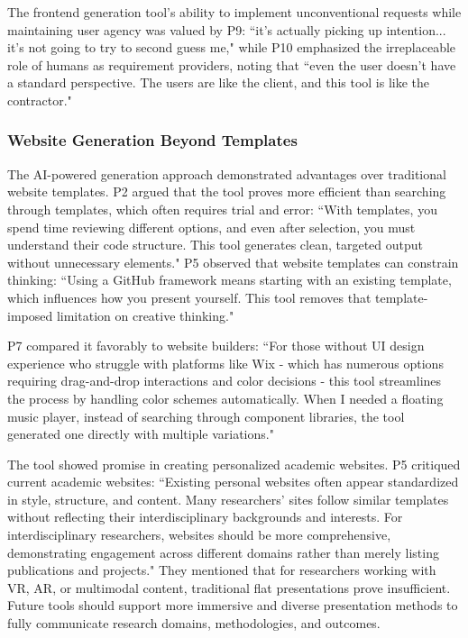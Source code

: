 The frontend generation tool's ability to implement unconventional requests while maintaining user agency was valued by P9: ``it's actually picking up intention... it's not going to try to second guess me," while P10 emphasized the irreplaceable role of humans as requirement providers, noting that ``even the user doesn't have a standard perspective. The users are like the client, and this tool is like the contractor."

\subsubsection{Website Generation Beyond Templates}

The AI-powered generation approach demonstrated advantages over traditional website templates. P2 argued that the tool proves more efficient than searching through templates, which often requires trial and error: ``With templates, you spend time reviewing different options, and even after selection, you must understand their code structure. This tool generates clean, targeted output without unnecessary elements." P5 observed that website templates can constrain thinking: ``Using a GitHub framework means starting with an existing template, which influences how you present yourself. This tool removes that template-imposed limitation on creative thinking."

P7 compared it favorably to website builders: ``For those without UI design experience who struggle with platforms like Wix - which has numerous options requiring drag-and-drop interactions and color decisions - this tool streamlines the process by handling color schemes automatically. When I needed a floating music player, instead of searching through component libraries, the tool generated one directly with multiple variations."

The tool showed promise in creating personalized academic websites. P5 critiqued current academic websites: ``Existing personal websites often appear standardized in style, structure, and content. Many researchers' sites follow similar templates without reflecting their interdisciplinary backgrounds and interests. For interdisciplinary researchers, websites should be more comprehensive, demonstrating engagement across different domains rather than merely listing publications and projects." They mentioned that for researchers working with VR, AR, or multimodal content, traditional flat presentations prove insufficient. Future tools should support more immersive and diverse presentation methods to fully communicate research domains, methodologies, and outcomes.
                
